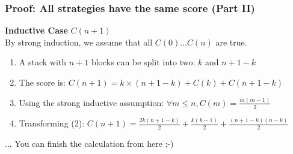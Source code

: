 \begin{frame}
  \frametitle{Proof: All strategies have the same score (Part II)}

    {\bf Inductive Case} $C(n+1)$\\
    By strong induction, we assume that all $C(0)\ldots C(n)$ are true.

    \bigskip

    \begin{enumerate}
    \item A stack with $n+1$ blocks can be split into two: $k$ and $n+1-k$\medskip

    \item The score is: $C(n+1) = k\times(n+1-k) + C(k) + C(n+1-k)$\medskip

    \item Using the strong inductive assumption: $\forall m \leq n, C(m) = \frac{m(m-1)}{2}$\medskip
    
    \item Transforming (2): $C(n+1) = \frac{2k(n+1-k)}{2} + \frac{k(k-1)}{2} +
      \frac{(n+1-k)(n-k)}{2}$
  \end{enumerate}\bigskip

  ... You can finish the calculation from here ;-)
\end{frame}
